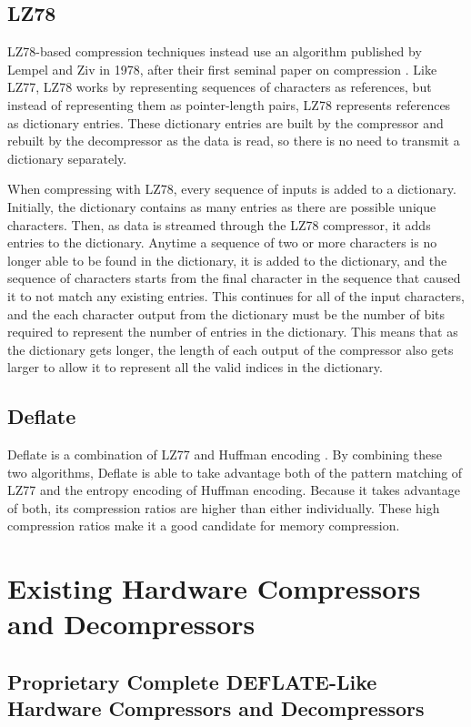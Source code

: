 \documentclass[doublespace,draft,nopageskip]{VTthesis} %
\begin{document}
\subsection{LZ78}\label{ss:lz78}
LZ78-based compression techniques instead use an algorithm published by Lempel and Ziv in 1978, after their first seminal paper on compression \cite{lz78}. Like LZ77, LZ78 works by representing sequences of characters as references, but instead of representing them as pointer-length pairs, LZ78 represents references as dictionary entries. These dictionary entries are built by the compressor and rebuilt by the decompressor as the data is read, so there is no need to transmit a dictionary separately.

When compressing with LZ78, every sequence of inputs is added to a dictionary. Initially, the dictionary contains as many entries as there are possible unique characters. Then, as data is streamed through the LZ78 compressor, it adds entries to the dictionary. Anytime a sequence of two or more characters is no longer able to be found in the dictionary, it is added to the dictionary, and the sequence of characters starts from the final character in the sequence that caused it to not match any existing entries. This continues for all of the input characters, and the each character output from the dictionary must be the number of bits required to represent the number of entries in the dictionary. This means that as the dictionary gets longer, the length of each output of the compressor also gets larger to allow it to represent all the valid indices in the dictionary.

\subsection{Deflate}\label{ss:deflate}
Deflate is a combination of LZ77 and Huffman encoding \cite{deflate}. By combining these two algorithms, Deflate is able to take advantage both of the pattern matching of LZ77 and the entropy encoding of Huffman encoding. Because it takes advantage of both, its compression ratios are higher than either individually. These high compression ratios make it a good candidate for memory compression.

\section{Existing Hardware Compressors and Decompressors}\label{se:existing_hardware_compressors_and_decompressors}
\subsection{Proprietary Complete DEFLATE-Like Hardware Compressors and Decompressors}\label{ss:complete_deflate-like_hardware_compressors_and_decompressors}
\end{document}
